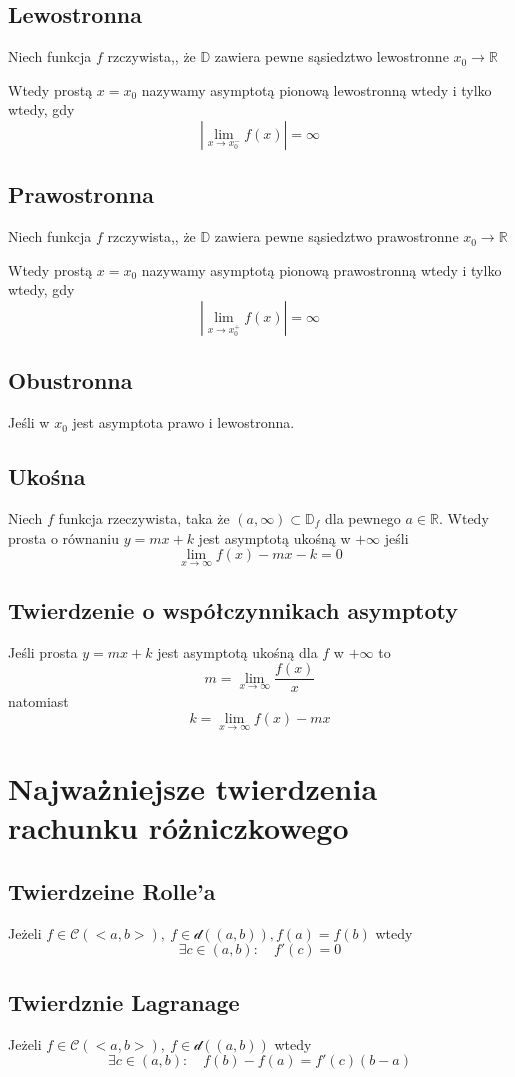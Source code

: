 \documentclass[11pt]{article}
\begin{document}
\subsection{Lewostronna}
Niech funkcja $f$ rzczywista,, że $\mathbb{D}$ zawiera pewne sąsiedztwo lewostronne $x_0 \to \mathbb{R}$

Wtedy prostą $x = x_0$ nazywamy asymptotą pionową lewostronną wtedy i tylko wtedy, gdy
$$|\lim_{x \to x_0^{-}}{f(x)}| = \infty$$
\subsection{Prawostronna}
Niech funkcja $f$ rzczywista,, że $\mathbb{D}$ zawiera pewne sąsiedztwo prawostronne $x_0 \to \mathbb{R}$

Wtedy prostą $x = x_0$ nazywamy asymptotą pionową prawostronną wtedy i tylko wtedy, gdy
$$|\lim_{x \to x_0^{+}}{f(x)}| = \infty$$
\subsection{Obustronna}
Jeśli w $x_0$ jest asymptota prawo i lewostronna.
\subsection{Ukośna}
Niech $f$ funkcja rzeczywista, taka że $(a,\infty) \subset \mathbb{D}_f$ dla pewnego $a \in \mathbb{R}$. Wtedy prosta o równaniu $y = mx + k$ jest asymptotą ukośną w $+\infty$ jeśli $$ \lim_{x \to \infty}{f(x) - mx -k} = 0$$
\subsection{Twierdzenie o współczynnikach asymptoty}
Jeśli prosta $y =mx +k$ jest asymptotą ukośną dla $f$ w $+\infty$ to $$ m = \lim_{x \to \infty}{\frac{f(x)}{x}}$$ natomiast $$ k = \lim_{x \to \infty}{f(x) - mx}$$

\section{Najważniejsze twierdzenia rachunku różniczkowego}
\subsection{Twierdzeine Rolle'a}
Jeżeli $f \in \mathcal{C}(<a,b>),\ f \in \mathcal{d}((a,b)), f(a) = f(b)$ wtedy
$$ \exists c\in (a,b): \quad f'(c) = 0$$
\subsection{Twierdznie Lagranage}
Jeżeli $f \in \mathcal{C}(<a,b>),\ f \in \mathcal{d}((a,b))$ wtedy
$$ \exists c \in (a,b): \quad f(b) - f(a) = f'(c)(b -a)$$
\end{document}
